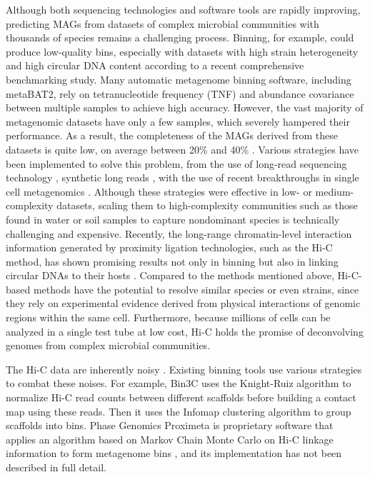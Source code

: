 \documentclass[fleqn,10pt,lineno]{wlpeerj}
\begin{document}
Although both sequencing technologies and software tools are rapidly improving, predicting MAGs from datasets of complex microbial communities with thousands of species remains a challenging process. Binning, for example, could produce low-quality bins, especially with datasets with high strain heterogeneity and high circular DNA content according to a recent comprehensive benchmarking study\citep{meyer2021critical}. Many automatic metagenome binning software, including metaBAT2, rely on tetranucleotide frequency (TNF) and abundance covariance between multiple samples \citep{kang2019metabat} to achieve high accuracy. However, the vast majority of metagenomic datasets have only a few samples, which severely hampered their performance. As a result, the completeness of the MAGs derived from these datasets is quite low, on average between 20\% and 40\% \citep{meyer2021critical}. Various strategies have been implemented to solve this problem, from the use of long-read sequencing technology \citep{Bickhart2022GeneratingLC, Frank2016ImprovedMA}, synthetic long reads \citep{Chen2019SimpleAS}, 
with the use of recent breakthroughs in single cell metagenomics \citep{Arikawa2021RecoveryOH, bowers2022dissecting}. Although these strategies were effective in low- or medium-complexity datasets, scaling them to high-complexity communities such as those found in water or soil samples to capture nondominant species is technically challenging and expensive. Recently, the long-range chromatin-level interaction information generated by proximity ligation technologies, such as the Hi-C method, has shown promising results not only in binning but also in linking circular DNAs to their hosts \citep{Burton2014SpeciesLevelDO, Beitel2014StrainAP, press2017hi}. Compared to the methods mentioned above, Hi-C-based methods have the potential to resolve similar species or even strains, since they rely on experimental evidence derived from physical interactions of genomic regions within the same cell. Furthermore, because millions of cells can be analyzed in a single test tube at low cost, Hi-C holds the promise of deconvolving genomes from complex microbial communities.

The Hi-C data are inherently noisy \citep{Yaffe2011ProbabilisticMO}. Existing binning tools use various strategies to combat these noises. For example, Bin3C uses the Knight-Ruiz algorithm to normalize Hi-C read counts between different scaffolds before building a contact map using these reads. Then it uses the Infomap clustering algorithm to group scaffolds into bins\citep{demaere2019bin3c}.  Phase Genomics Proximeta is proprietary software that applies an algorithm based on Markov Chain Monte Carlo on Hi-C linkage information to form metagenome bins \citep{press2017hi}, and its implementation has not been described in full detail.  
\end{document}
